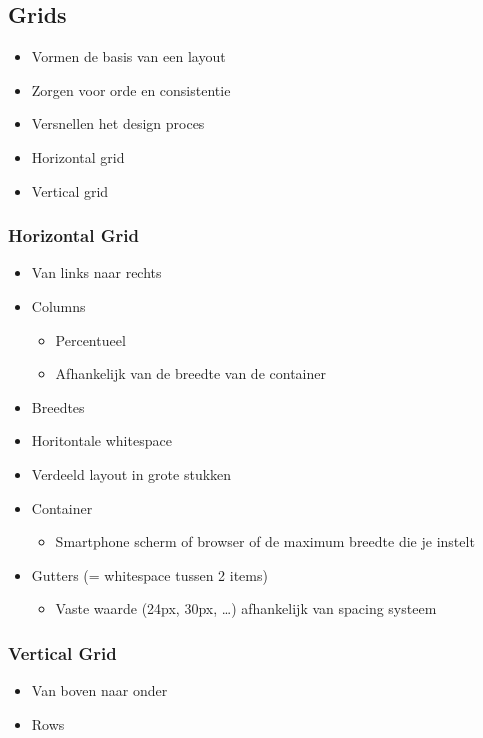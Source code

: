 \documentclass{article}
\begin{document}
\subsection{Grids}
\begin{itemize}
    \item Vormen de basis van een layout
    \item Zorgen voor orde en consistentie
    \item Versnellen het design proces
    \item Horizontal grid
    
    \item Vertical grid
    
\end{itemize}

\subsubsection{Horizontal Grid}
\begin{itemize}
    \item Van links naar rechts
    \item Columns
    \begin{itemize}
        \item Percentueel
        \item Afhankelijk van de breedte van de container
    \end{itemize}
    \item Breedtes
    \item Horitontale whitespace
    \item Verdeeld layout in grote stukken
    \item Container
    \begin{itemize}
        \item Smartphone scherm of browser of de maximum breedte die je instelt
    \end{itemize}
    \item Gutters (= whitespace tussen 2 items)
    \begin{itemize}
        \item Vaste waarde (24px, 30px, \dots) afhankelijk van spacing systeem
    \end{itemize}
\end{itemize}

\subsubsection{Vertical Grid}
\begin{itemize}
    \item Van boven naar onder
    \item Rows
\end{itemize}
\end{document}
